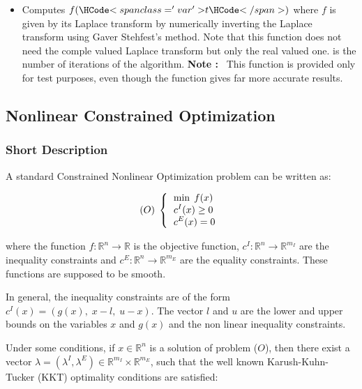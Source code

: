 \begin{itemize}
\item {}
  \sshortdescribe Computes $f(\var{t})$ where $f$ is given by its Laplace
  transform  by numerically inverting the Laplace transform using
  Gaver Stehfest's method. Note that this function does not
  need the comple valued Laplace transform but only the real valued
  one.  is the number of iterations of the algorithm.
  {\bf Note : }~This function is provided only for test purposes, even though
  the function  gives far more accurate results.
\end{itemize}

\subsection{Nonlinear Constrained Optimization}
\subsubsection{Short Description}

A standard Constrained Nonlinear Optimization problem can be written as:

\begin{equation*}
  (O)\;
  \left\{
    \begin{tabular}{l}
      $\displaystyle   \min \; f(x)$ \\
      $\displaystyle c^I(x) \geq 0$ \\
      $\displaystyle c^E(x) = 0$
    \end{tabular}
  \right.
\end{equation*}

where the function $f : \mathbb{R}^n \rightarrow  \mathbb{R}$ is the objective function, $c^I : \mathbb{R}^n \rightarrow  \mathbb{R}^{m_I} $ are the inequality constraints and $c^E : \mathbb{R}^n \rightarrow  \mathbb{R}^{m_E} $ are the equality constraints. These functions are supposed to be smooth.

In general, the inequality constraints are of the form $c^I(x) = \left (g(x), \; x-l, \; u-x \right )$. The vector $l$ and $u$ are the lower and upper bounds on the variables $x$ and $g(x)$ and the non linear inequality constraints.

Under some conditions, if $x \in \mathbb{R}^n$ is a solution of problem ($O$), then there exist a vector $\lambda=(\lambda^I,\lambda^E) \in \mathbb{R}^{m_I} \times \mathbb{R}^{m_E}$, such that the well known Karush-Kuhn-Tucker (KKT) optimality conditions are satisfied:


